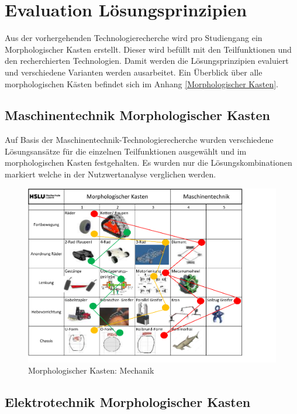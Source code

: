 \section{Evaluation Lösungsprinzipien}

Aus der vorhergehenden Technologierecherche wird pro Studiengang ein Morphologischer Kasten erstellt. Dieser wird befüllt mit den Teilfunktionen und den recherchierten Technologien. Damit werden die Lösungsprinzipien evaluiert und verschiedene Varianten werden ausarbeitet. Ein Überblick über alle morphologischen Kästen befindet sich im Anhang \ref{Morphologischer Kasten}.

\subsection{Maschinentechnik Morphologischer Kasten}

Auf Basis der Maschinentechnik-Technologierecherche wurden verschiedene Lösungsansätze für die einzelnen Teilfunktionen ausgewählt und im morphologischen Kasten festgehalten. Es wurden nur die Lösungskombinationen markiert welche in der Nutzwertanalyse verglichen werden.  

\begin{figure}[H]
\centering
\includegraphics[width=\textwidth]{assets/MK-Maschinentechnik.pdf}
\caption{Morphologischer Kasten: Mechanik}
\label{fig:mk-mechanik}
\end{figure}


\subsection{Elektrotechnik Morphologischer Kasten}

